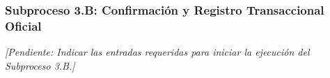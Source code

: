 \subsubsection{Subproceso 3.B: Confirmación y Registro Transaccional Oficial}

\textit{[Pendiente: Indicar las entradas requeridas para iniciar la ejecución del Subproceso 3.B.]}

